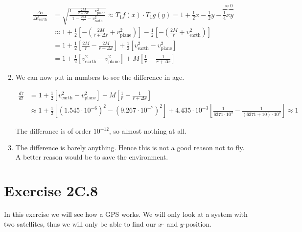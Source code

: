 \documentclass[a4paper,10pt,english]{article}
\begin{document}
\begin{enumerate}
\begin{align*}
\frac{\Delta\tau}{\Delta t_{\text{earth}}}&=\sqrt{\frac{1-\frac{2M}{r+\Delta r}-v_{\text{plane}}^{2}}{1-\frac{2M}{r}-v_{\text{earth}}^{2}}}\approx T_{1}f(x)\cdot T_{1}g(y)=1+\frac{1}{2}x-\frac{1}{2}y-\overbrace{\frac{1}{4}xy}^{\approx0}\\
&\approx1+\frac{1}{2}\left[-\left(\frac{2M}{r+\Delta r}+v_{\text{plane}}^{2}\right)\right]-\frac{1}{2}\left[-\left(\frac{2M}{r}+v_{\text{earth}}^{2}\right)\right]\\
&=1+\frac{1}{2}\left[\frac{2M}{r}-\frac{2M}{r+\Delta r}\right]+\frac{1}{2}\left[v_{\text{earth}}^{2}-v_{\text{plane}}^{2}\right]\\
&=1+\frac{1}{2}\left[v_{\text{earth}}^{2}-v_{\text{plane}}^{2}\right]+M\left[\frac{1}{r}-\frac{1}{r+\Delta r}\right]
\end{align*}

\item We can now put in numbers to see the difference in age.

\begin{align*}
\frac{d\tau}{dt}&=1+\frac{1}{2}\left[v_{\text{earth}}^{2}-v_{\text{plane}}^{2}\right]+M\left[\frac{1}{r}-\frac{1}{r+\Delta r}\right]\\
&\approx1+\frac{1}{2}\left[(1.545\cdot10^{-6})^{2}-(9.267\cdot10^{-7})^{2}\right]+4.435\cdot10^{-3}\left[\frac{1}{6371\cdot10^{3}}-\frac{1}{(6371+10)\cdot10^{3}}\right]\approx1
\end{align*}

The differance is of order $10^{-12}$, so almost nothing at all.

\item The difference is barely anything. Hence this is not a good reason not to fly. A better reason would be to save the environment.

\end{enumerate}








\section*{Exercise 2C.8}

In this exercise we will see how a GPS works. We will only look at a system with two satellites, thus we will only be able to find our $x$- and $y$-position.
\end{document}
